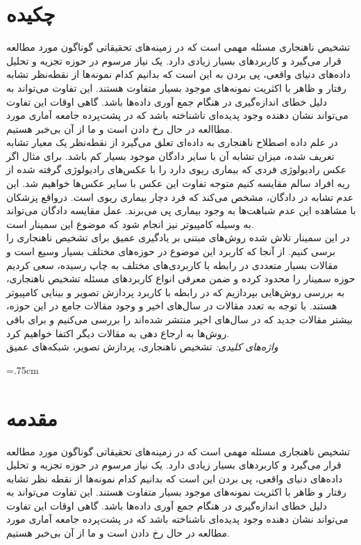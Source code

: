 \documentclass[12pt,a4paper]{report}
\newcommand*{\BeginNoToc}{%
  \addtocontents{toc}{%
    \edef\protect\SavedTocDepth{\protect\the\protect\value{tocdepth}}%
  }%
  \addtocontents{toc}{%
    \protect\setcounter{tocdepth}{-10}%
  }%
}
\newcommand*{\EndNoToc}{%
  \addtocontents{toc}{%
    \protect\setcounter{tocdepth}{\protect\SavedTocDepth}%
  }%
}
\theoremstyle{definition}
\theoremstyle{definition}
\begin{document}
	\chapter*{چکیده}
	تشخیص ناهنجاری‌ مسئله مهمی است که در زمینه‌های تحقیقاتی گوناگون مورد مطالعه قرار می‌گیرد و کاربرد‌های بسیار زیادی دارد. یک نیاز مرسوم در حوزه تجزیه و تحلیل داده‌های دنیای واقعی، پی بردن به این است که بدانیم کدام نمونه‌ها از نقطه‌نظر تشابه رفتار و ظاهر با اکثریت نمونه‌های موجود بسیار متفاوت هستند. این تفاوت می‌تواند به دلیل خطای انداز‌ه‌گیری در هنگام جمع آوری داده‌ها باشد. گاهی اوقات این تفاوت می‌تواند نشان‌ دهنده وجود پدیده‌ای ناشناخته‌ باشد که در پشت‌پرده جامعه آماری مورد مطاالعه در حال رخ دادن است و ما از آن بی‌خبر هستیم. \\

در علم داده اصطلاح ناهنجاری به داده‌ای تعلق می‌گیرد از نقطه‌نظر یک معیار تشابه تعریف شده، میزان تشابه آن با سایر دادگان موجود بسیار کم باشد. برای مثال اگر عکس رادیولوژی فردی که بیماری ریوی دارد را با عکس‌های رادیولوژی گرفته شده از ریه افراد سالم مقایسه کنیم متوجه تفاوت این عکس با سایر عکس‌ها خواهیم شد. این عدم تشابه در دادگان، مشخص می‌کند  که فرد دچار بیماری ریوی است. درواقع پزشکان با مشاهده این عدم شباهت‌ها به وجود بیماری پی می‌برند. عمل مقایسه دادگان می‌تواند به وسیله کامپیوتر نیز انجام شود که موضوع این سمینار است.\\

در این سمینار تلاش شده روش‌های مبتنی بر یادگیری عمیق برای تشخیص ناهنجاری را برسی کنیم. از آنجا که کاربرد این موضوع در حوزه‌های مختلف بسیار وسیع است و مقالات بسیار متعددی در رابطه با کاربردی‌های مختلف به چاپ رسیده، سعی کردیم حوزه سمینار را محدود کرده و ضمن معرفی انواع کاربرد‌های مسئله تشخیص ناهنجاری، به بررسی روش‌هایی بپردازیم که در رابطه با کاربرد پردازش تصویر و بینایی کامپیوتر هستند. با توجه به تعدد مقالات در سال‌های اخیر و وجود مقالات جامع در این حوزه، بیشتر مقالات جدید که در سال‌های اخیر منتشر شده‌اند را بررسی می‌کنیم و برای باقی روش‌ها به ارجاع دهی به مقالات دیگر اکتفا خواهیم کرد.\\

	\textit{
واژه‌های کلیدی:
	}
	تشخیص ناهنجاری، پردازش تصویر، شبکه‌های عمیق
	\newpage
	\baselineskip=1cm
	\BeginNoToc
	\tableofcontents
	\listoffigures
	\listoftables
	\EndNoToc
	\newpage
	\baselineskip=.75cm

\chapter{مقدمه}
	تشخیص ناهنجاری‌ مسئله مهمی است که در زمینه‌های تحقیقاتی گوناگون مورد مطالعه قرار می‌گیرد و کاربرد‌های بسیار زیادی دارد. یک نیاز مرسوم در حوزه تجزیه و تحلیل داده‌های دنیای واقعی، پی بردن این است که بدانیم کدام نمونه‌ها از نقطه نظر تشابه رفتار و ظاهر با اکثریت نمونه‌های موجود بسیار متفاوت هستند. این تفاوت می‌تواند به دلیل خطای انداز‌ه‌گیری در هنگام جمع آوری داده‌ها باشد. گاهی اوقات این تفاوت می‌تواند نشان‌ دهنده وجود پدیده‌ای ناشناخته‌ باشد که در پشت‌پرده جامعه آماری مورد مطالعه در حال رخ دادن است و ما از آن بی‌خبر هستیم. 
	
\end{document}
